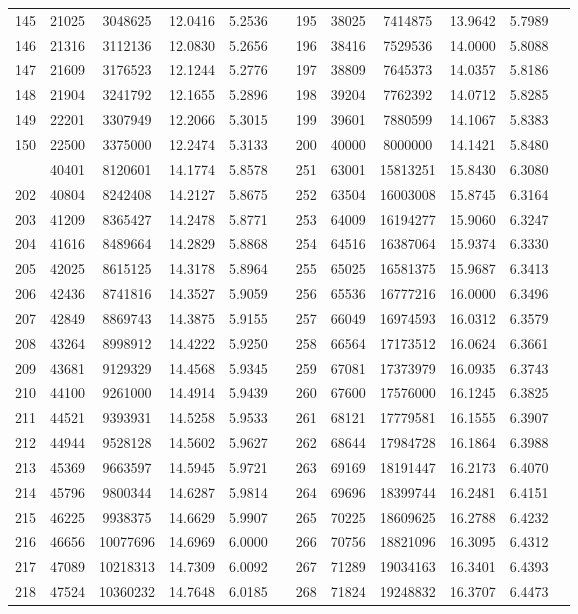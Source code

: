 \begin{longtable}{SSSSSSSSSSSS}
145&21025&3048625&12.0416&5.2536&&195&38025&7414875&13.9642&5.7989\\
146&21316&3112136&12.0830&5.2656&&196&38416&7529536&14.0000&5.8088\\
147&21609&3176523&12.1244&5.2776&&197&38809&7645373&14.0357&5.8186\\
148&21904&3241792&12.1655&5.2896&&198&39204&7762392&14.0712&5.8285\\
149&22201&3307949&12.2066&5.3015&&199&39601&7880599&14.1067&5.8383\\
150&22500&3375000&12.2474&5.3133&&200&40000&8000000&14.1421&5.8480\\
&40401&8120601&14.1774&5.8578&&251&63001&15813251&15.8430&6.3080\\
202&40804&8242408&14.2127&5.8675&&252&63504&16003008&15.8745&6.3164\\
203&41209&8365427&14.2478&5.8771&&253&64009&16194277&15.9060&6.3247\\
204&41616&8489664&14.2829&5.8868&&254&64516&16387064&15.9374&6.3330\\
205&42025&8615125&14.3178&5.8964&&255&65025&16581375&15.9687&6.3413\\
206&42436&8741816&14.3527&5.9059&&256&65536&16777216&16.0000&6.3496\\
207&42849&8869743&14.3875&5.9155&&257&66049&16974593&16.0312&6.3579\\
208&43264&8998912&14.4222&5.9250&&258&66564&17173512&16.0624&6.3661\\
209&43681&9129329&14.4568&5.9345&&259&67081&17373979&16.0935&6.3743\\
210&44100&9261000&14.4914&5.9439&&260&67600&17576000&16.1245&6.3825\\
211&44521&9393931&14.5258&5.9533&&261&68121&17779581&16.1555&6.3907\\
212&44944&9528128&14.5602&5.9627&&262&68644&17984728&16.1864&6.3988\\
213&45369&9663597&14.5945&5.9721&&263&69169&18191447&16.2173&6.4070\\
214&45796&9800344&14.6287&5.9814&&264&69696&18399744&16.2481&6.4151\\
215&46225&9938375&14.6629&5.9907&&265&70225&18609625&16.2788&6.4232\\
216&46656&10077696&14.6969&6.0000&&266&70756&18821096&16.3095&6.4312\\
217&47089&10218313&14.7309&6.0092&&267&71289&19034163&16.3401&6.4393\\
218&47524&10360232&14.7648&6.0185&&268&71824&19248832&16.3707&6.4473\\

\end{longtable}
